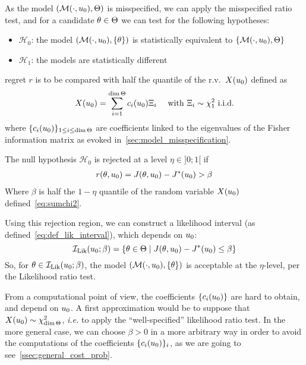 \documentclass[../../Main_ManuscritThese.tex]{subfiles}
\begin{document}
  
  As the model $(\mathcal{M}(\cdot, u_0), \Theta)$ is misspecified,
  we can apply the misspecified ratio test, and for a candidate
  $\theta\in \Theta$ we can test for the following hypotheses:
 \begin{itemize}
 \item $\mathcal{H}_0$: the model $\left(\mathcal{M}(\cdot, u_0), \{\theta\}\right)$ is statistically equivalent to $\left\{\mathcal{M}(\cdot, u_0), \Theta\right\}$
 \item $\mathcal{H}_1$: the models are statistically different
 \end{itemize}
 regret $r$ is to be compared with half the quantile of the r.v.\
 $X(u_0)$ defined as
  \begin{equation}
    \label{eq:sumchi2}
X(u_0)=\sum_{i=1}^{\dim \Theta} c_i(u_0) \Xi_i \quad \text{ with } \Xi_i \sim \chi^2_1 \text{ i.i.d.}
\end{equation}
where $\{c_i(u_0)\}_{1\leq i \leq \dim \Theta}$ are coefficients
linked to the eigenvalues of the Fisher information matrix as evoked
in~\cref{sec:model_misspecification}.
 
 The null hypothesis $\mathcal{H}_0$ is rejected at a level
 $\eta \in ]0;1[$ if
  \begin{align}
    r(\theta, u_0)=J(\theta, u_0) - J^*(u_0) > \beta 
  \end{align}
  Where $\beta$ is half the $1-\eta$ quantile of the random variable $X(u_0)$ defined~\eqref{eq:sumchi2}.
  
 Using this rejection region, we can construct a likelihood interval (as defined~\cref{eq:def_lik_interval}), which depends on $u_0$:
  \begin{equation}
    \label{eq:lik_interval_add}
    \mathcal{I}_{\mathrm{Lik}}(u_0; \beta) = \left\{\theta\in \Theta \mid  J(\theta, u_0) - J^*(u_0) \leq \beta\right\}
  \end{equation}
  So, for $\theta \in \mathcal{I}_{\mathrm{Lik}}(u_0;\beta)$, the model
  $(\mathcal{M}(\cdot, u_0),\{\theta\})$ is acceptable at the
  $\eta$-level, per the Likelihood ratio test.

  
  From a computational point of view, the coefficients
  $\{c_i(u_0)\}$ are hard to obtain, and depend on $u_0$. A first
  approximation would be to suppose that
  $X(u_0) \sim \chi^2_{\dim \Theta}$, \emph{i.e.} to apply the
  ``well-specified'' likelihood ratio test. In the more general case,
  we can choose $\beta>0$ in a more arbitrary way in order to avoid
  the computations of the coefficients $\{c_i(u_0)\}_i$, as we are
  going to see~\cref{ssec:general_cost_prob}.
  
\end{document}
